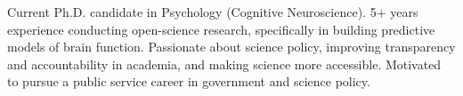 

\begin{cvparagraph}

Current Ph.D. candidate in Psychology (Cognitive Neuroscience). 5+ years experience conducting open-science research, specifically in building predictive models of brain function. Passionate about science policy, improving transparency and accountability in academia, and making science more accessible. Motivated to pursue a public service career in government and science policy. 

\end{cvparagraph}
